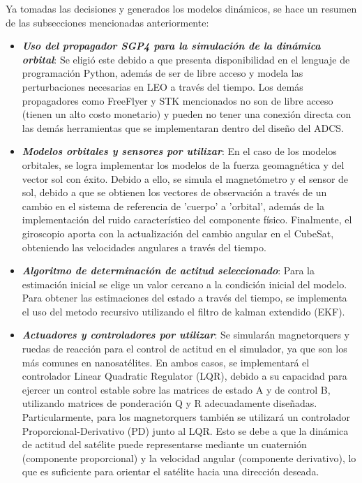 Ya tomadas las decisiones y generados los modelos dinámicos, se hace un resumen de las subsecciones mencionadas anteriormente:

\begin{itemize}
	\item \textbf{\textit{Uso del propagador SGP4 para la simulación de la dinámica orbital}}: Se eligió este debido a que presenta disponibilidad en el lenguaje de programación Python, además de ser de libre acceso y modela las perturbaciones necesarias en LEO a través del tiempo. Los demás propagadores como FreeFlyer y STK mencionados no son de libre acceso (tienen un alto costo monetario) y pueden no tener una conexión directa con las demás herramientas que se implementaran dentro del diseño del ADCS.
	
	\item \textbf{\textit{Modelos orbitales y sensores por utilizar}}: En el caso de los modelos orbitales, se logra implementar los modelos de la fuerza geomagnética y del vector sol con éxito. Debido a ello, se simula el magnetómetro y el sensor de sol, debido a que se obtienen los vectores de observación a través de un cambio en el sistema de referencia de 'cuerpo' a 'orbital', además de la implementación del ruido característico del componente físico. Finalmente, el giroscopio aporta con la actualización del cambio angular en el CubeSat, obteniendo las velocidades angulares a través del tiempo.
	
	\item\textbf{\textit{ Algoritmo de determinación de actitud seleccionado}}: Para la estimación inicial se elige un valor cercano a la condición inicial del modelo. Para obtener las estimaciones del estado a través del tiempo, se implementa el uso del metodo recursivo utilizando el filtro de kalman extendido (EKF).
	
	\item \textbf{\textit{Actuadores y controladores por utilizar}}: Se simularán magnetorquers y ruedas de reacción para el control de actitud en el simulador, ya que son los más comunes en nanosatélites. En ambos casos, se implementará el controlador Linear Quadratic Regulator (LQR), debido a su capacidad para ejercer un control estable sobre las matrices de estado A y de control 	B, utilizando matrices de ponderación Q y R adecuadamente diseñadas. Particularmente, para los magnetorquers también se utilizará un controlador Proporcional-Derivativo (PD) junto al LQR. Esto se debe a que la dinámica de actitud del satélite puede representarse mediante un cuaternión (componente proporcional) y la velocidad angular (componente derivativo), lo que es suficiente para orientar el satélite hacia una dirección deseada.
\end{itemize}


